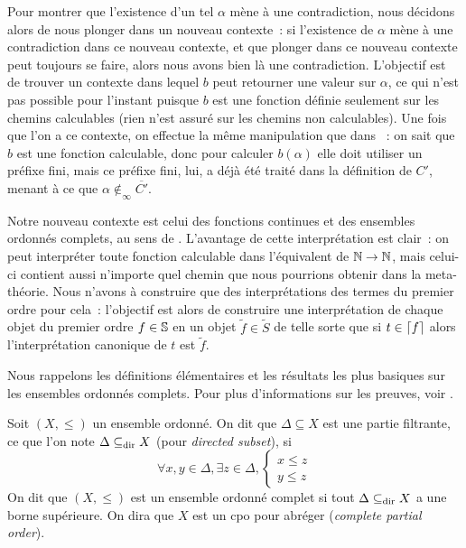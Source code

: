 \documentclass{article}
\begin{document}
Pour montrer que l'existence d'un tel $\alpha$ mène à une contradiction, nous décidons alors de nous plonger dans un nouveau contexte~: si l'existence de $\alpha$ mène à une contradiction dans ce nouveau contexte, et que plonger dans ce nouveau contexte peut toujours se faire, alors nous avons bien là une contradiction. L'objectif est de trouver un contexte dans lequel $b$ peut retourner une valeur sur $\alpha$, ce qui n'est pas possible pour l'instant puisque $b$ est une fonction définie seulement sur les chemins calculables (rien n'est assuré sur les chemins non calculables). Une fois que l'on a ce contexte, on effectue la même manipulation que dans \cite{lubarsky2015realizabilitymodelsseparatingvarious}~: on sait que $b$ est une fonction calculable, donc pour calculer $b(\alpha)$ elle doit utiliser un préfixe fini, mais ce préfixe fini, lui, a déjà été traité dans la définition de $C'$, menant à ce que $\alpha\notin_\infty \overline{C'}$.

Notre nouveau contexte est celui des fonctions continues et des ensembles ordonnés complets, au sens de \cite{Amadio_Curien_1998}. L'avantage de cette interprétation est clair~: on peut interpréter toute fonction calculable dans l'équivalent de $\mathbb{N}\to\mathbb{N}$, mais celui-ci contient aussi n'importe quel chemin que nous pourrions obtenir dans la meta-théorie. Nous n'avons à construire que des interprétations des termes du premier ordre pour cela~: l'objectif est alors de construire une interprétation de chaque objet du premier ordre $f \in \mathbb{S}$ en un objet $\tilde f \in \tilde S$ de telle sorte que si $t\in\lceil f \rceil$ alors l'interprétation canonique de $t$ est $\tilde f$.

Nous rappelons les définitions élémentaires et les résultats les plus basiques sur les ensembles ordonnés complets. Pour plus d'informations sur les preuves, voir \cite{Amadio_Curien_1998}.

\begin{defi}
    Soit $(X,\leq)$ un ensemble ordonné. On dit que $\Delta\subseteq X$ est une partie filtrante, ce que l'on note $\Delta\subseteq_{\mathrm{dir}} X$ (pour \textit{directed subset}), si
    \[\forall x,y \in \Delta, \exists z \in \Delta, \left\{\begin{array}{c}
        x \leq z\\
        y \leq z
    \end{array}\right.\]
    On dit que $(X,\leq)$ est un ensemble ordonné complet si tout $\Delta\subseteq_{\mathrm{dir}} X$ a une borne supérieure. On dira que $X$ est un cpo pour abréger (\textit{complete partial order}).
\end{defi}
\end{document}
